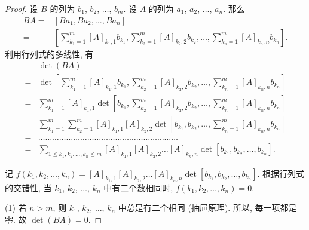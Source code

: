 \documentclass[%
    UTF8,%
    fontset=none,%
    punct=kaiming,%
    zihao=-4,%
    a4paper,%
    oneside,%
]{ctexbook}
\renewcommand*{\leq}{\leqslant}
\begin{document}
\begin{proof}
    设 \(B\) 的列为 \(b_1\), \(b_2\), \(\dots\), \(b_m\).
    设 \(A\) 的列为 \(a_1\), \(a_2\), \(\dots\), \(a_n\).
    那么
    \begin{align*}
        BA
        = {} & [Ba_1, Ba_2, \dots, Ba_n] \\
        = {} &
        \left[
        \sum_{k_1 = 1}^{m} {[A]_{k_1,1} b_{k_1}},
        \sum_{k_2 = 1}^{m} {[A]_{k_2,2} b_{k_2}},
        \dots,
        \sum_{k_n = 1}^{m} {[A]_{k_n,n} b_{k_n}}
        \right].
    \end{align*}
    利用行列式的多线性, 有
    \begin{align*}
             & \det {(BA)}
        \\
        = {} &
        \det {\left[
        \sum_{k_1 = 1}^{m} {[A]_{k_1,1} b_{k_1}},
        \sum_{k_2 = 1}^{m} {[A]_{k_2,2} b_{k_2}},
        \dots,
        \sum_{k_n = 1}^{m} {[A]_{k_n,n} b_{k_n}}
        \right]}
        \\
        = {} &
        \sum_{k_1 = 1}^{m} {[A]_{k_1,1}
        \det {\left[
        b_{k_1},
        \sum_{k_2 = 1}^{m} {[A]_{k_2,2} b_{k_2}},
        \dots,
        \sum_{k_n = 1}^{m} {[A]_{k_n,n} b_{k_n}}
        \right]}}
        \\
        = {} &
        \sum_{k_1 = 1}^{m} {
        \sum_{k_2 = 1}^{m} {
        [A]_{k_1,1} [A]_{k_2,2}
        \det {\left[
        b_{k_1},
        b_{k_2},
        \dots,
        \sum_{k_n = 1}^{m} {[A]_{k_n,n} b_{k_n}}
        \right]}}}
        \\
        = {} &
        \dots \dots \dots \dots
        \dots \dots \dots \dots
        \dots \dots \dots \dots
        \dots \dots \dots \dots
        \dots \dots \dots \dots
        \\
        = {} &
        \sum_{1 \leq k_1, k_2, \dots, k_n \leq m}
        {[A]_{k_1,1} [A]_{k_2,2} \dots [A]_{k_n,n}
            \det {[b_{k_1}, b_{k_2}, \dots, b_{k_n}]}}.
    \end{align*}

    记
    \(
    f(k_1, k_2, \dots, k_n)
    = [A]_{k_1,1} [A]_{k_2,2} \dots [A]_{k_n,n}
    \det {[b_{k_1}, b_{k_2}, \dots, b_{k_n}]}.
    \)
    根据行列式的交错性,
    当 \(k_1\), \(k_2\), \(\dots\), \(k_n\) 中有二个数相同时,
    \(f(k_1, k_2, \dots, k_n) = 0\).

    (1)
    若 \(n > m\), 则 \(k_1\), \(k_2\), \(\dots\), \(k_n\)
    中总是有二个相同
    (抽屉原理).
    所以, 每一项都是零.
    故 \(\det {(BA)} = 0\).


\end{proof}
\end{document}
